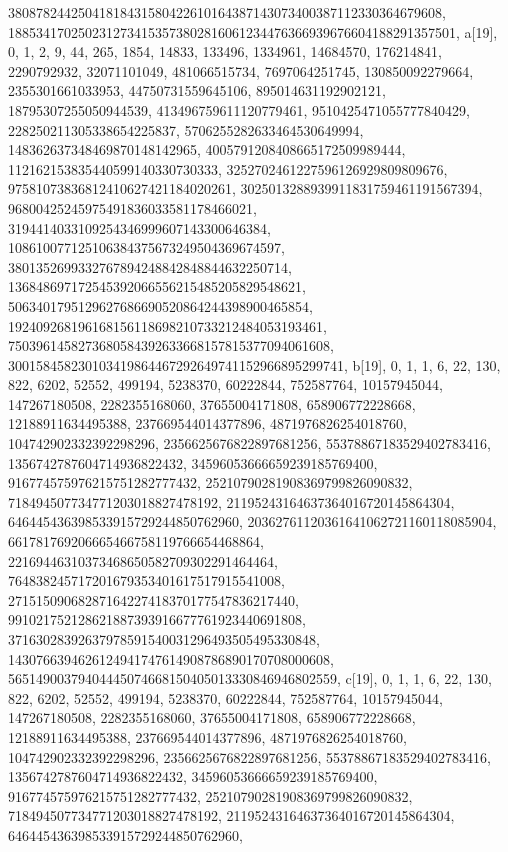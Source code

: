 {{{   38087824425041818431580422610164387143073400387112330364679608, 
   1885341702502312734153573802816061234476366939676604188291357501}}, 
 {a[19], {0, 1, 2, 9, 44, 265, 1854, 14833, 133496, 1334961, 14684570, 
   176214841, 2290792932, 32071101049, 481066515734, 7697064251745, 
   130850092279664, 2355301661033953, 44750731559645106, 895014631192902121, 
   18795307255050944539, 413496759611120779461, 9510425471055777840429, 
   228250211305338654225837, 5706255282633464530649994, 
   148362637348469870148142965, 4005791208408665172509989444, 
   112162153835440599140330730333, 3252702461227596126929809809676, 
   97581073836812410627421184020261, 3025013288939911831759461191567394, 
   96800425245975491836033581178466021, 
   3194414033109254346999607143300646384, 
   108610077125106384375673249504369674597, 
   3801352699332767894248842848844632250714, 
   136848697172545392066556215485205829548621, 
   5063401795129627686690520864244398900465854, 
   192409268196168156118698210733212484053193461, 
   7503961458273680584392633668157815377094061608, 
   300158458230103419864467292649741152966895299741}}, 
 {b[19], {0, 1, 1, 6, 22, 130, 822, 6202, 52552, 499194, 5238370, 60222844, 
   752587764, 10157945044, 147267180508, 2282355168060, 37655004171808, 
   658906772228668, 12188911634495388, 237669544014377896, 
   4871976826254018760, 104742902332392298296, 2356625676822897681256, 
   55378867183529402783416, 1356742787604714936822432, 
   34596053666659239185769400, 916774575976215751282777432, 
   25210790281908369799826090832, 718494507734771203018827478192, 
   21195243164637364016720145864304, 646445436398533915729244850762960, 
   20362761120361641062721160118085904, 661781769206665466758119766654468864, 
   22169446310373468650582709302291464464, 
   764838245717201679353401617517915541008, 
   27151509068287164227418370177547836217440, 
   991021752128621887393916677761923440691808, 
   37163028392637978591540031296493505495330848, 
   1430766394626124941747614908786890170708000608, 
   56514900379404445074668150405013330846946802559}}, 
 {c[19], {0, 1, 1, 6, 22, 130, 822, 6202, 52552, 499194, 5238370, 60222844, 
   752587764, 10157945044, 147267180508, 2282355168060, 37655004171808, 
   658906772228668, 12188911634495388, 237669544014377896, 
   4871976826254018760, 104742902332392298296, 2356625676822897681256, 
   55378867183529402783416, 1356742787604714936822432, 
   34596053666659239185769400, 916774575976215751282777432, 
   25210790281908369799826090832, 718494507734771203018827478192, 
   21195243164637364016720145864304, 646445436398533915729244850762960, 
}}}
